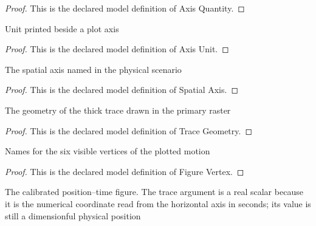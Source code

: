 \begin{proof}
  This is the declared model definition of Axis Quantity.
\end{proof}
\begin{definition}
  \label{def:physics:phyx-mini-0669:phyxminiproblems-problemphyxmini0669-axisunit}
  Unit printed beside a plot axis
\end{definition}
\begin{proof}
  This is the declared model definition of Axis Unit.
\end{proof}
\begin{definition}
  \label{def:physics:phyx-mini-0669:phyxminiproblems-problemphyxmini0669-spatialaxis}
  The spatial axis named in the physical scenario
\end{definition}
\begin{proof}
  This is the declared model definition of Spatial Axis.
\end{proof}
\begin{definition}
  \label{def:physics:phyx-mini-0669:phyxminiproblems-problemphyxmini0669-tracegeometry}
  The geometry of the thick trace drawn in the primary raster
\end{definition}
\begin{proof}
  This is the declared model definition of Trace Geometry.
\end{proof}
\begin{definition}
  \label{def:physics:phyx-mini-0669:phyxminiproblems-problemphyxmini0669-figurevertex}
  Names for the six visible vertices of the plotted motion
\end{definition}
\begin{proof}
  This is the declared model definition of Figure Vertex.
\end{proof}
\begin{definition}
  \label{def:physics:phyx-mini-0669:phyxminiproblems-problemphyxmini0669-positiontimefigure}
  The calibrated position--time figure. The trace argument is a real scalar because it is the numerical coordinate read from the horizontal axis in seconds; its value is still a dimensionful physical position
\end{definition}
